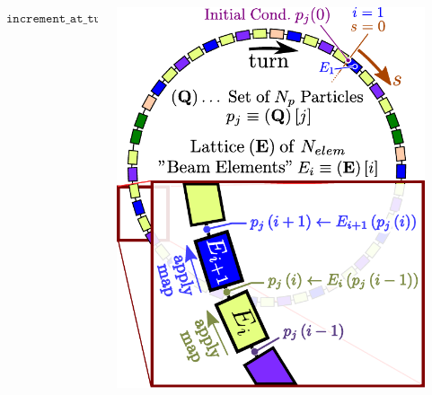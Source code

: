 \documentclass{beamer}
\begin{document}
\begin{frame}[t]
\begin{columns}
\begin{column}{0.6\textwidth}
\begin{algorithm}[H]
\small
\begin{algorithmic}
\label{alg1:line:loop_particles}
    \label{alg1:line:ref_p}
    \label{alg1:line:loop_turns}
        \label{alg1:line:loop_lattice}
            \label{alg1:line:ref_elem}
            \label{alg1:line:apply_map}
            \label{alg1:line:is_lost_check}
            \EndIf
        \EndFor
        \label{alg1:line:is_lost_check2}
            \State $\texttt{increment\_at\_turn}(p_j)$\label{alg1:line:inc_turn}
        \EndIf
    \EndWhile
\EndFor
\EndProcedure
\end{algorithmic}
\end{algorithm}
\end{column}
\begin{column}{0.4\textwidth}
    \includegraphics[width=0.9\textwidth]{poster_images/fig_tracking_algorithm}
\end{column}
\end{columns}
\end{frame}
\end{document}
